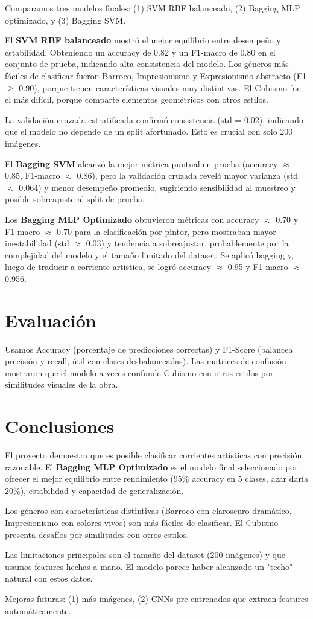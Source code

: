 \documentclass[8pt,a4paper]{article}
\begin{document}
Comparamos tres modelos finales: (1) SVM RBF balanceado, (2) Bagging MLP optimizado, y (3) Bagging SVM.

El \textbf{SVM RBF balanceado} mostró el mejor equilibrio entre desempeño y estabilidad. Obteniendo un accuracy de 0.82 y un F1-macro de 0.80 en el conjunto de prueba, indicando alta consistencia del modelo. Los géneros más fáciles de clasificar fueron Barroco, Impresionismo y Expresionismo abstracto (F1 $\geq$ 0.90), porque tienen características visuales muy distintivas. El Cubismo fue el más difícil, porque comparte elementos geométricos con otros estilos.

La validación cruzada estratificada confirmó consistencia (std = 0.02), indicando que el modelo no depende de un split afortunado. Esto es crucial con solo 200 imágenes.

El \textbf{Bagging SVM} alcanzó la mejor métrica puntual en prueba (accuracy $\approx$ 0.85, F1-macro $\approx$ 0.86), pero la validación cruzada reveló mayor varianza (std $\approx$ 0.064) y menor desempeño promedio, sugiriendo sensibilidad al muestreo y posible sobreajuste al split de prueba.

Los \textbf{Bagging MLP Optimizado} obtuvieron métricas con accuracy $\approx$ 0.70 y F1-macro $\approx$ 0.70 para la clasificación por pintor, pero mostraban mayor inestabilidad (std $\approx$ 0.03) y tendencia a sobreajustar, probablemente por la complejidad del modelo y el tamaño limitado del dataset. Se aplicó bagging y, luego de traducir a corriente artística, se logró accuracy $\approx$ 0.95 y F1-macro $\approx$ 0.956.

\section{Evaluación}

Usamos Accuracy (porcentaje de predicciones correctas) y F1-Score (balancea precisión y recall, útil con clases desbalanceadas). Las matrices de confusión mostraron que el modelo a veces confunde Cubismo con otros estilos por similitudes visuales de la obra.

\section{Conclusiones}

El proyecto demuestra que es posible clasificar corrientes artísticas con precisión razonable. El \textbf{Bagging MLP Optimizado} es el modelo final seleccionado por ofrecer el mejor equilibrio entre rendimiento (95\% accuracy en 5 clases, azar daría 20\%), estabilidad y capacidad de generalización.

Los géneros con características distintivas (Barroco con claroscuro dramático, Impresionismo con colores vivos) son más fáciles de clasificar. El Cubismo presenta desafíos por similitudes con otros estilos.

Las limitaciones principales son el tamaño del dataset (200 imágenes) y que usamos features hechas a mano. El modelo parece haber alcanzado un "techo" natural con estos datos.

Mejoras futuras: (1) más imágenes, (2) CNNs pre-entrenadas que extraen features automáticamente.
\end{document}
